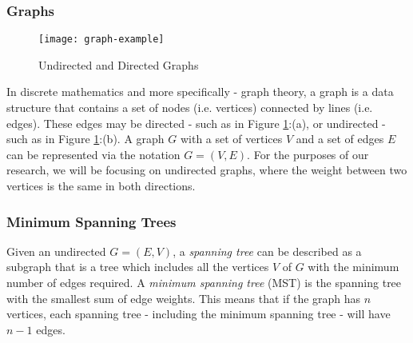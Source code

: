 \documentclass[a4paper,11pt]{article}
\begin{document}
\subsubsection{Graphs}
\begin{figure}[H]
\centering
\texttt{[image: graph-example]}
\caption{Undirected and Directed Graphs}
\label{fig:graph.example}
\end{figure}
In discrete mathematics and more specifically - graph theory, a graph is a data structure that contains a set of nodes (i.e. vertices) connected by lines (i.e. edges).  These edges may be directed - such as in Figure \ref{fig:graph.example}:(a), or undirected - such as in Figure \ref{fig:graph.example}:(b). A graph $G$ with a set of vertices $V$ and a set of edges $E$ can be represented via the notation $G = (V,E)$. For the purposes of our research, we will be focusing on undirected graphs, where the weight between two vertices is the same in both directions.
\subsubsection{Minimum Spanning Trees}
Given an undirected $G = (E,V)$,  a \textit{spanning tree} can be described as a subgraph that is a tree which includes all the vertices $V$ of $G$ with the minimum number of edges required. A \textit{minimum spanning tree} (MST) is the spanning tree with the smallest sum of edge weights.  This means that if the graph has $n$ vertices, each spanning tree - including the minimum spanning tree - will have $n-1$ edges.
\newpage
\end{document}
